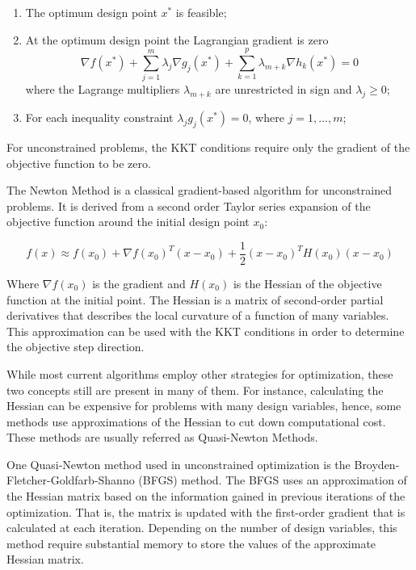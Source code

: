 \begin{enumerate}
	\item The optimum design point $x^*$ is feasible;
	\item At the optimum design point the Lagrangian gradient is zero
	\begin{equation}
	\nabla f(x^*) + \sum_{j=1}^{m} \lambda_j \nabla g_j (x^*) + \sum_{k=1}^{p} \lambda_{m+k} \nabla h_k (x^*) = 0
	\end{equation}
	where the Lagrange multipliers $\lambda_{m+k}$ are unrestricted in sign and $\lambda_j \geq 0$;
	\item For each inequality constraint $\lambda_j g_j(x^*) = 0$, where $j = 1,...,m$;
\end{enumerate}

For unconstrained problems, the KKT conditions require only the gradient of the objective function to be zero.

The Newton Method is a classical gradient-based algorithm for unconstrained problems. It is derived from a second order Taylor series expansion of the objective function around the initial design point $x_0$:

\begin{equation}
f(x) \approx f(x_0) + \nabla f(x_0)^T (x-x_0) + \frac{1}{2} (x-x_0)^T H(x_0) (x-x_0)
\end{equation}

Where $\nabla f(x_0)$ is the gradient and $H(x_0)$ is the Hessian of the objective function at the initial point. The Hessian is a matrix of second-order partial derivatives that describes the local curvature of a function of many variables. This approximation can be used with the KKT conditions in order to determine the objective step direction.

While most current algorithms employ other strategies for optimization, these two concepts still are present in many of them. For instance, calculating the Hessian can be expensive for problems with many design variables, hence, some methods use approximations of the Hessian to cut down computational cost. These methods are usually referred as Quasi-Newton Methods.

One Quasi-Newton method used in unconstrained optimization is the Broyden-Fletcher-Goldfarb-Shanno (BFGS) method. The BFGS uses an approximation of the Hessian matrix based on the information gained in previous iterations of the optimization. That is, the matrix is updated with the first-order gradient that is calculated at each iteration. Depending on the number of design variables, this method require substantial memory to store the values of the approximate Hessian matrix.

